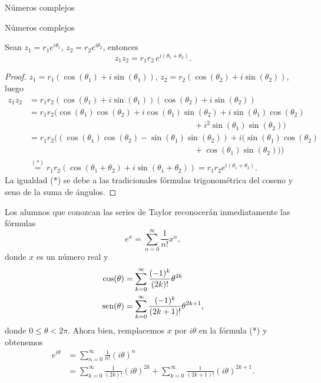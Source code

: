 \begin{chapter}{N\'umeros complejos}
\begin{section}{N\'umeros complejos}
        \begin{proposicion}
            Sean $z_1 = r_1 e^{i\theta_1}$, $z_2 = r_2 e^{i\theta_2}$,  entonces
            $$
            z_1 z_2 =  r_1r_2 \,e^{i(\theta_1+ \theta_2)}.
            $$
        \end{proposicion}
        \begin{proof}
            $z_1 = r_1(\cos(\theta_1)+i\sin(\theta_1))$, $z_2 = r_2(\cos(\theta_2)+i\sin(\theta_2))$, luego
            \begin{align*}
            z_1z_2 &= r_1r_2(\cos(\theta_1)+i\sin(\theta_1))(\cos(\theta_2)+i\sin(\theta_2)) \\
            &= r_1r_2(\cos(\theta_1)\cos(\theta_2)+i\cos(\theta_1)\sin(\theta_2)+i\sin(\theta_1)\cos(\theta_2) \\
            &\qquad\qquad\qquad\qquad\qquad\qquad\qquad\qquad\qquad\qquad+i^2\sin(\theta_1)\sin(\theta_2)) \\
            &= r_1r_2((\cos(\theta_1)\cos(\theta_2)-\sin(\theta_1)\sin(\theta_2))+i(\sin(\theta_1)\cos(\theta_2)\\
            &\qquad\qquad\qquad\qquad\qquad\qquad\qquad\qquad \qquad\qquad +\cos(\theta_1)\sin(\theta_2))) \\
            &\overset{(*)}= r_1r_2(\cos(\theta_1+\theta_2) + i\sin(\theta_1+\theta_2)) =  r_1r_2e^{i(\theta_1+ \theta_2)}.
            \end{align*}
            La igualdad ($*$) se debe a las tradicionales fórmulas trigonométrica del coseno y  seno de la suma de ángulos.
        \end{proof}
        
        
        \begin{observacion*} Los alumnos que conozcan las series de Taylor reconocerán inmediatamente las fórmulas
            \begin{equation*}
                e^x = \sum_{n=0}^{\infty} \frac{1}{n!}x^n, \tag{*} 
            \end{equation*} 
            donde $x$ es un número real y
            \begin{align*}
                \cos(\theta) &=  \sum_{k=0}^{\infty} \frac{(-1)^k}{(2k)!}\theta^{2k} \\ 
                \operatorname{sen}(\theta) &= \sum_{k=0}^{\infty} \frac{ (-1)^k}{(2k+1)!}\theta^{2k+1} , 
            \end{align*}
            donde $0 \le \theta < 2\pi$. Ahora bien, remplacemos $x$ por $i\theta$ en la fórmula (*) y obtenemos
            \begin{align*}
                e^{i\theta} &= \sum_{n=0}^{\infty} \frac{1}{n!}(i\theta)^n \\
                &=  \sum_{k=0}^{\infty} \frac{1}{(2k)!}(i\theta)^{2k}  + \sum_{k=0}^{\infty} \frac{1}{(2k+1)!}(i\theta)^{2k+1}. \tag{**}
            \end{align*}
        

\end{observacion*}
\end{section}
\end{chapter}
